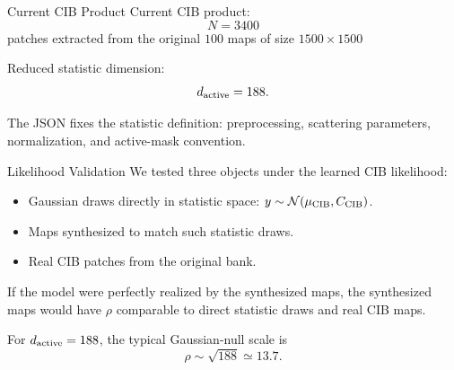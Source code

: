 \documentclass[aspectratio=169]{beamer}
\newcommand{\mucib}{\mu_{\rm CIB}}
\newcommand{\Ccib}{C_{\rm CIB}}
\begin{document}
\begin{frame}{Current CIB Product}
  Current CIB product:
  \[
    N = 3400
  \]
  patches extracted from the original $100$ maps of size $1500 \times 1500$ 

  \vspace{0.35cm}
  Reduced statistic dimension:
  \[
    d_{\rm active}=188.
  \]

  \vspace{0.35cm}
  The JSON fixes the statistic definition: preprocessing, scattering
  parameters, normalization, and active-mask convention.
\end{frame}

\begin{frame}{Likelihood Validation}
  We tested three objects under the learned CIB likelihood:

  \vspace{0.2cm}
  \begin{itemize}
    \item Gaussian draws directly in statistic space:
    \(y\sim \mathcal{N}(\mucib,\Ccib)\).
    \item Maps synthesized to match such statistic draws.
    \item Real CIB patches from the original bank.
  \end{itemize}

  \vspace{0.3cm}
  If the model were perfectly realized by the synthesized maps, the synthesized
  maps would have \(\rho\) comparable to direct statistic draws and real CIB maps.

  \vspace{0.3cm}
  For \(d_{\rm active}=188\), the typical Gaussian-null scale is
  \[
    \rho \sim \sqrt{188} \simeq 13.7.
  \]
\end{frame}
\end{document}

